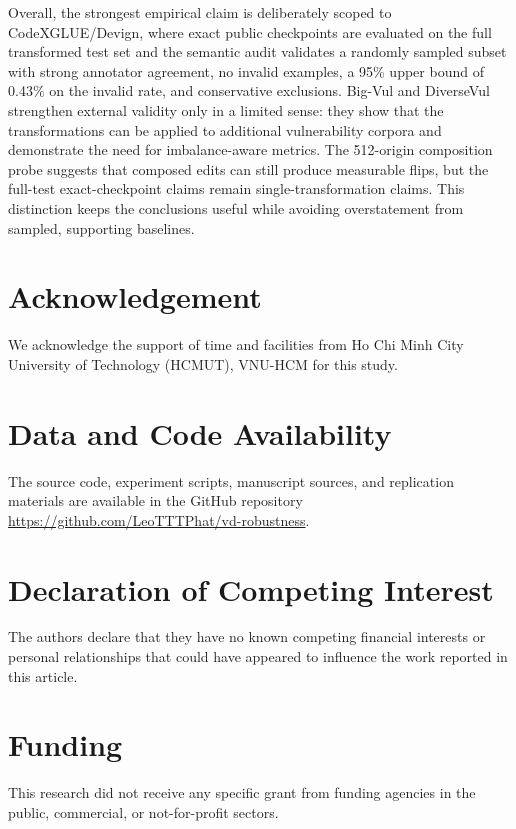 \documentclass[a4paper,fleqn]{cas-dc}
\begin{document}
Overall, the strongest empirical claim is deliberately scoped to
CodeXGLUE/Devign, where exact public checkpoints are evaluated on the full
transformed test set and the semantic audit validates a randomly sampled
subset with strong annotator agreement, no invalid examples, a 95\% upper
bound of 0.43\% on the invalid rate, and conservative exclusions. Big-Vul and DiverseVul
strengthen external validity only in a limited sense: they show that the
transformations can be applied to additional vulnerability corpora and
demonstrate the need for imbalance-aware metrics. The 512-origin composition
probe suggests that composed edits can still produce measurable flips, but the
full-test exact-checkpoint claims remain single-transformation claims. This
distinction keeps the conclusions useful while avoiding overstatement from
sampled, supporting baselines.

\section*{Acknowledgement}

We acknowledge the support of time and facilities from Ho Chi Minh City
University of Technology (HCMUT), VNU-HCM for this study.

\section*{Data and Code Availability}

The source code, experiment scripts, manuscript sources, and replication
materials are available in the GitHub repository
\href{https://github.com/LeoTTTPhat/vd-robustness}{https://github.com/LeoTTTPhat/vd-robustness}.

\section*{Declaration of Competing Interest}

The authors declare that they have no known competing financial interests or
personal relationships that could have appeared to influence the work reported
in this article.

\section*{Funding}

This research did not receive any specific grant from funding agencies in the
public, commercial, or not-for-profit sectors.



\end{document}
